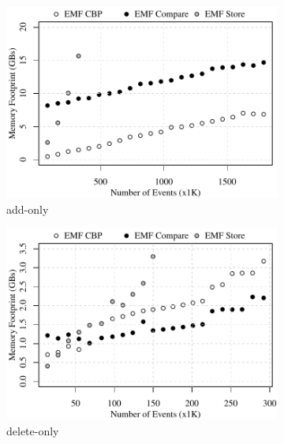 \begin{figure}[ht]
\centering
\begin{subfigure}[t]{0.490\linewidth}
	\includegraphics[width=\linewidth]{add-conflict-memory-events}
	\caption{add-only}
	\label{fig:add-conflict-memory-events}
\end{subfigure}
\hfill
\begin{subfigure}[t]{0.490\linewidth}
	\includegraphics[width=\linewidth]{delete-conflict-memory-events}
	\caption{delete-only}
	\label{fig:delete-conflict-memory-events}
\end{subfigure}
\\
\begin{subfigure}[t]{0.490\linewidth}

\end{subfigure}
\end{figure}
